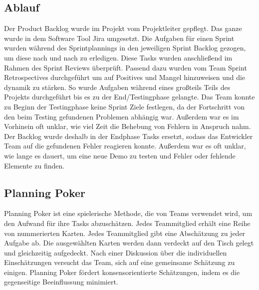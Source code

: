 \subsection{Ablauf}\label{subsec:Ablauf}
Der Product Backlog wurde im Projekt vom Projektleiter gepflegt. Das ganze wurde in dem Software Tool Jira umgesetzt.
Die Aufgaben für einen Sprint wurden während des Sprintplannings in den jeweiligen Sprint Backlog gezogen, um diese nach und nach zu erledigen.
Diese Tasks wurden anschließend im Rahmen des Sprint Reviews überprüft. Passend dazu wurden vom Team Sprint Retrospectives durchgeführt um auf Positives und Mangel hinzuweisen und die dynamik zu stärken.
So wurde Aufgaben während eines großteils Teils des Projekts durchgeführt bis es zu der End/Testingphase gelangte.
Das Team konnte zu Beginn der Testingphase keine Sprint Ziele festlegen, da der Fortschritt von den beim Testing gefundenen Problemen abhängig war. Außerdem war es im Vorhinein oft unklar, wie viel Zeit die Behebung von Fehlern in Anspruch nahm.
Der Backlog wurde deshalb in der Endphase Tasks ersetzt, sodass das Entwickler Team auf die gefundenen Fehler reagieren konnte.
Außerdem war es oft unklar, wie lange es dauert, um eine neue Demo zu testen und Fehler oder fehlende Elemente zu finden.
\subsection{Planning Poker}\label{subsec:Planning-Poker}
Planning Poker ist eine spielerische Methode, die von Teams verwendet wird, um den Aufwand für ihre Tasks abzuschätzen.
Jedes Teammitglied erhält eine Reihe von nummerierten Karten. Jedes Teammitglied gibt eine Abschätzung zu jeder Aufgabe ab.
Die ausgewählten Karten werden dann verdeckt auf den Tisch gelegt und gleichzeitig aufgedeckt.
Nach einer Diskussion über die individuellen Einschätzungen versucht das Team, sich auf eine gemeinsame Schätzung zu einigen.
Planning Poker fördert konsensorientierte Schätzungen, indem es die gegenseitige Beeinflussung minimiert. \cite[vgl.]{PlanningPoker}

\renewcommand{\kapitelautor}{}
